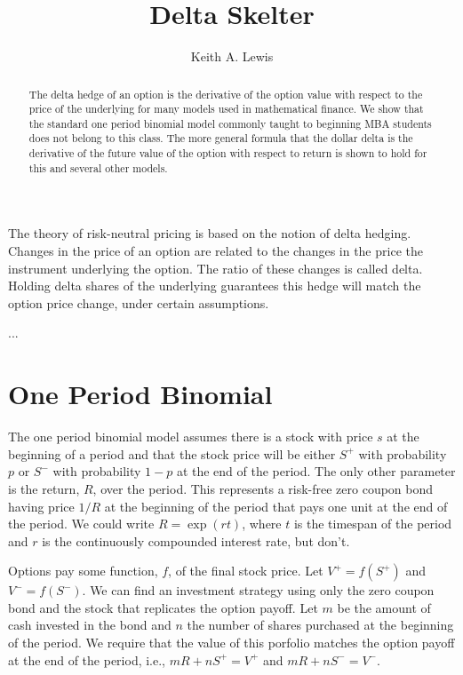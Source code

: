 \documentclass[12pt,fleqn]{amsart}
\begin{document}
\title{Delta Skelter}
\author{Keith A. Lewis}
\maketitle

\begin{abstract}
The delta hedge of an option is the derivative of the option value
with respect to the price of the underlying for many models used in
mathematical finance. We show that the standard one period binomial
model commonly taught to beginning MBA students does not belong to
this class. The more general formula that the dollar delta is the
derivative of the future value of the option with respect to return 
is shown to hold for this and several other models.
\end{abstract}

The theory of risk-neutral pricing is based on the notion of delta
hedging. Changes in the price of an option are related to the changes
in the price the instrument underlying the option. The ratio of these
changes is called delta. Holding delta shares of the underlying
guarantees this hedge will match the option price change, under
certain assumptions.

...

\section{One Period Binomial}

The one period binomial model assumes there is a stock with price $s$
at the beginning of a period and that the stock price will be either
$S^+$ with probability $p$ or $S^-$ with probability $1 - p$ at the
end of the period. The only other parameter is the return, $R$, over the
period. This represents a risk-free zero coupon bond having price $1/R$ at
the beginning of the period that pays one unit at the end of the period.
We could write $R = \exp(rt)$, where $t$ is the timespan of the period
and $r$ is the continuously compounded interest rate, but don't.

Options pay some function, $f$, of the final stock price.  Let $V^+ =
f(S^+)$ and $V^- = f(S^-)$. We can find an investment strategy using only
the zero coupon bond and the stock that replicates the option payoff.
Let $m$ be the amount of cash invested in the bond and $n$ the number
of shares purchased at the beginning of the period.  We require that
the value of this porfolio matches the option payoff at the end of the
period, i.e., $mR + nS^+ = V^+$ and $mR + nS^- = V^-$.
\end{document}
